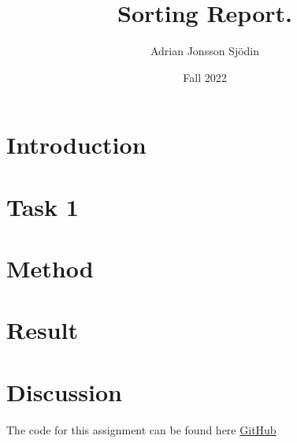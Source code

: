 \documentclass[a4paper,11pt]{article}
\begin{document}
\title{
    \textbf{Sorting Report.}
}
\author{Adrian Jonsson Sjödin}
\date{Fall 2022}

\maketitle

\section*{Introduction}

\section*{Task 1}


\section*{Method}



\section*{Result}



\section*{Discussion}



The code for this assignment can be found here \href{https://github.com/adrian-jonsson-sjoedin/ID1021-AlgoData/blob/main/Tasks/Sorting/src}{GitHub}
\end{document}
